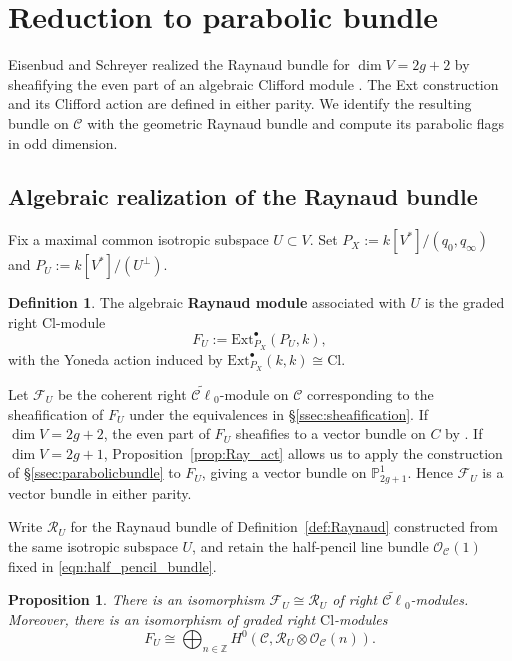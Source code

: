 \documentclass[12pt, letterpaper]{amsart}
\newtheorem{proposition}[theorem]{Proposition}
\theoremstyle{definition}
\newtheorem{definition}[theorem]{Definition}
\newcommand{\PP}{\mathbb{P} }
\newcommand{\ZZ}{\mathbb{Z} }
\newcommand{\cC}{\mathcal{C} }
\newcommand{\cF}{\mathcal{F} }
\newcommand{\cO}{\mathcal{O} }
\newcommand{\cR}{\mathcal{R} }
\def\Ext{\mathrm{Ext} }
\def\Cl{\mathrm{Cl}}
\begin{document}
\section{Reduction to parabolic bundle}\label{sec:reductionparabolic}

Eisenbud and Schreyer realized the Raynaud bundle for \(\dim V=2g+2\) by sheafifying the even part of an algebraic Clifford module \cite[\S4]{ES25}. The Ext construction and its Clifford action are defined in either parity. We identify the resulting bundle on \(\cC\) with the geometric Raynaud bundle and compute its parabolic flags in odd dimension.

\subsection{Algebraic realization of the Raynaud bundle}\label{ssec:Raynaudalgebraic}

Fix a maximal common isotropic subspace \(U\subset V\). Set \(P_X:=k[V^*]/(q_0,q_\infty)\) and \(P_U:=k[V^*]/(U^\perp)\).

\begin{definition}\label{def:Raynaudmodule}
The algebraic \textbf{Raynaud module} associated with \(U\) is the graded right \(\Cl\)-module
\[F_U:=\Ext_{P_X}^\bullet(P_U,k),\]
with the Yoneda action induced by \(\Ext_{P_X}^\bullet(k,k)\cong\Cl\).
\end{definition}

Let \(\cF_U\) be the coherent right \(\widetilde{\cC\ell}_0\)-module on \(\cC\) corresponding to the sheafification of \(F_U\) under the equivalences in \S\ref{ssec:sheafification}. If \(\dim V=2g+2\), the even part of \(F_U\) sheafifies to a vector bundle on \(C\) by \cite[Proposition~4.5]{ES25}. If \(\dim V=2g+1\), Proposition~\ref{prop:Ray_act} allows us to apply the construction of \S\ref{ssec:parabolicbundle} to \(F_U\), giving a vector bundle on \(\PP_{2g+1}^1\). Hence \(\cF_U\) is a vector bundle in either parity.

Write \(\cR_U\) for the Raynaud bundle of Definition~\ref{def:Raynaud} constructed from the same isotropic subspace \(U\), and retain the half-pencil line bundle \(\cO_{\cC}(1)\) fixed in \eqref{eqn:half_pencil_bundle}.

\begin{proposition}\label{prop:Raynaudidentical}
There is an isomorphism \(\cF_U\cong\cR_U\) of right \(\widetilde{\cC\ell}_0\)-modules. Moreover, there is an isomorphism of graded right \(\Cl\)-modules
\[F_U\cong\bigoplus_{n\in\ZZ}H^0\!\left(\cC, \cR_U\otimes\cO_{\cC}(n) \right).\]
\end{proposition}
\end{document}
